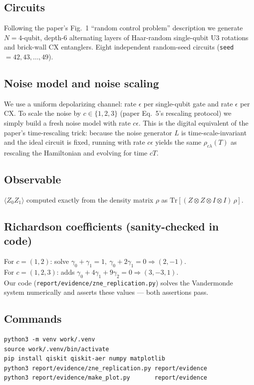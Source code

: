 \documentclass[11pt]{article}
\begin{document}
\subsection{Circuits}
Following the paper's Fig.~1 ``random control problem'' description we generate $N{=}4$-qubit,
depth-6 alternating layers of Haar-random single-qubit U3 rotations and brick-wall CX
entanglers. Eight independent random-seed circuits (\texttt{seed} $= 42, 43, \dots, 49$).

\subsection{Noise model and noise scaling}
We use a uniform depolarizing channel: rate $\epsilon$ per single-qubit gate and rate $\epsilon$
per CX. To scale the noise by $c \in \{1,2,3\}$ (paper Eq.~5's rescaling protocol) we simply
build a fresh noise model with rate $c\epsilon$. This is the digital equivalent of the paper's
time-rescaling trick: because the noise generator $L$ is time-scale-invariant and the ideal
circuit is fixed, running with rate $c\epsilon$ yields the same $\rho_{c\lambda}(T)$ as
rescaling the Hamiltonian and evolving for time $cT$.

\subsection{Observable}
$\langle Z_0 Z_1\rangle$ computed exactly from the density matrix
$\rho$ as $\text{Tr}\!\left[(Z\otimes Z\otimes I \otimes I)\,\rho\right]$.

\subsection{Richardson coefficients (sanity-checked in code)}
For $c = (1, 2)$: solve $\gamma_0 + \gamma_1 = 1,\ \gamma_0 + 2\gamma_1 = 0 \Rightarrow (2, -1)$.\\
For $c = (1, 2, 3)$: adds $\gamma_0 + 4\gamma_1 + 9\gamma_2 = 0 \Rightarrow (3, -3, 1)$.\\
Our code (\verb|report/evidence/zne_replication.py|) solves the Vandermonde system numerically
and asserts these values --- both assertions pass.

\subsection{Commands}
\begin{lstlisting}
python3 -m venv work/.venv
source work/.venv/bin/activate
pip install qiskit qiskit-aer numpy matplotlib
python3 report/evidence/zne_replication.py report/evidence
python3 report/evidence/make_plot.py       report/evidence
\end{lstlisting}
\end{document}

